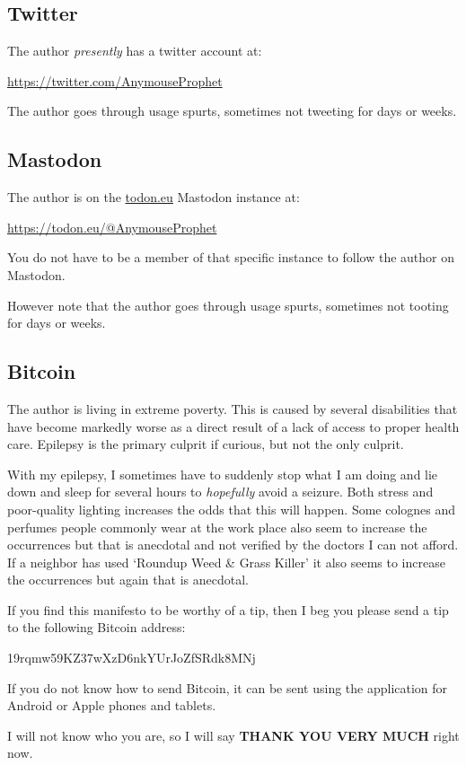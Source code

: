 \subsection{Twitter}

The author \emph{presently} has a twitter account at:

\bigskip

\url{https://twitter.com/AnymouseProphet}

\bigskip

The author goes through usage spurts, sometimes not tweeting for days or weeks.

\subsection{Mastodon}

The author is on the \url{todon.eu} Mastodon instance at:

\bigskip

\url{https://todon.eu/@AnymouseProphet}

\bigskip

You do not have to be a member of that specific instance to follow the author on Mastodon.

However note that the author goes through usage spurts, sometimes not tooting for days or weeks.

\subsection{Bitcoin}

The author is living in extreme poverty. This is caused by several disabilities that have become markedly worse as a direct result of a lack of access to proper health care. Epilepsy is the primary culprit if curious, but not the only culprit.

With my epilepsy, I sometimes have to suddenly stop what I am doing and lie down and sleep for several hours to \emph{hopefully} avoid a seizure. Both stress and poor-quality lighting increases the odds that this will happen. Some colognes and perfumes people commonly wear at the work place also seem to increase the occurrences but that is anecdotal and not verified by the doctors I can not afford. If a neighbor has used `Roundup\textregistered{} Weed \& Grass Killer' it also seems to increase the occurrences but again that is anecdotal.

If you find this manifesto to be worthy of a tip, then I beg you please send a tip to the following Bitcoin address:

\begin{center}
{\fontsize{11}{13.2}\selectfont 19rqmw59KZ37wXzD6nkYUrJoZfSRdk8MNj}

\medskip
{}
\end{center}


If you do not know how to send Bitcoin, it can be sent using the  application for Android or Apple phones and tablets.

I will not know who you are, so I will say \textbf{THANK YOU VERY MUCH} right now.
